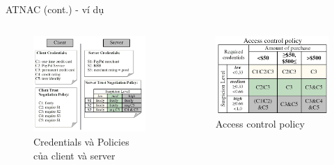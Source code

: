 \documentclass[11pt]{beamer}
\begin{document}
\begin{frame}{ATNAC (cont.) - ví dụ}
\begin{columns}
\begin{column}{0.5\textwidth}
\begin{figure}
\centering
\includegraphics[scale=.4]{img/atnac-example-1.png}
\caption{Credentials và Policies của client và server}
\label{fig:atnac-1}
\end{figure}
\end{column}
\begin{column}{0.5\textwidth}
\begin{figure}
\centering
\includegraphics[scale=.4]{img/atnac-example-2.png}
\caption{Access control policy}
\label{fig:atnac-2}
\end{figure}
\end{column}
\end{columns}
\end{frame}
\end{document}
